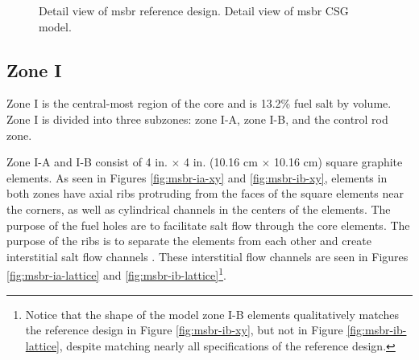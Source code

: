 \begin{figure}[htpb]
    \centering
    \caption[Detail views of MSBR core region]{
         Detail view of \Gls{msbr} reference design.
         Detail view of \Gls{msbr} CSG model.}
    \label{fig:msbr-detail}
\end{figure}

\subsection{Zone I} Zone I is the central-most region of the core and is 13.2\%
fuel salt by volume. Zone I is divided into three subzones: zone I-A, zone I-B,
and the control rod zone.

Zone I-A and I-B consist of 4 in. $\times$ 4 in. (10.16 cm $\times$ 10.16 cm)
square graphite elements. As seen in Figures \ref{fig:msbr-ia-xy} and
\ref{fig:msbr-ib-xy}, elements in both zones have axial ribs protruding from
the faces of the square elements near the corners, as well as cylindrical
channels in the centers of the elements. The purpose of the fuel holes are to
facilitate salt flow through the core elements. The purpose of the ribs is to
separate the elements from each other and create interstitial salt flow
channels \cite{robertson_conceptual_1971}. These interstitial flow channels
are seen in Figures \ref{fig:msbr-ia-lattice} and
\ref{fig:msbr-ib-lattice}\footnote{Notice that the shape of the model zone I-B
elements qualitatively matches the reference design in Figure
\ref{fig:msbr-ib-xy}, but  not in Figure \ref{fig:msbr-ib-lattice}, despite
matching nearly all specifications of the reference design.}.

